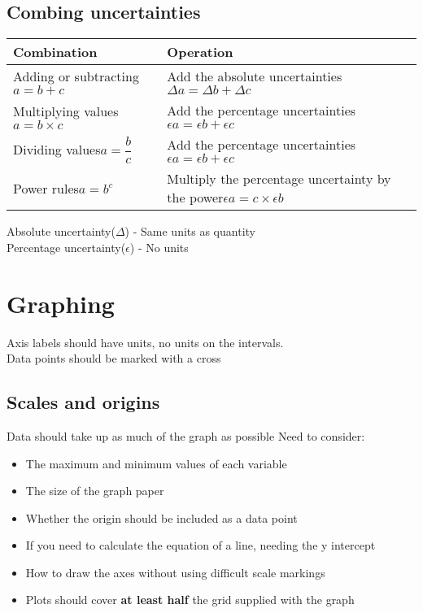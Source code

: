 \documentclass{article}[18pt]
\begin{document}
\subsection{Combing uncertainties}
\large
{\renewcommand{\arraystretch}{2}
\begin{tabularx}{\textwidth}{|X|X|}
\hline
Combination&Operation\\
\hline
Adding or subtracting\newline $a=b+c$&Add the absolute uncertainties\newline $\Delta a=\Delta b+\Delta c$\\
\hline
Multiplying values\newline $a=b\times c$&Add the percentage uncertainties\newline $\epsilon a=\epsilon b+\epsilon c$\\
\hline
Dividing values\newline $a=\dfrac{b}{c}$&Add the percentage uncertainties\newline $\epsilon a=\epsilon b+\epsilon c$\\
\hline
Power rules\newline $a=b^c$&Multiply the percentage uncertainty by the power\newline $\epsilon a=c\times\epsilon b$\\
\hline
\end{tabularx}}
Absolute uncertainty($\Delta$) - Same units as quantity\\
Percentage uncertainty($\epsilon$) - No units
\section{Graphing}
Axis labels should have units, no units on the intervals.
\\
Data points should be marked with a cross
\subsection{Scales and origins}
Data should take up as much of the graph as possible
Need to consider:
\begin{itemize}
\item The maximum and minimum values of each variable
\item The size of the graph paper
\item Whether the origin should be included as a data point
\item If you need to calculate the equation of a line, needing the y intercept
\item How to draw the axes without using difficult scale markings
\item Plots should cover \textbf{at least half} the grid supplied with the graph
\end{itemize}
\end{document}
